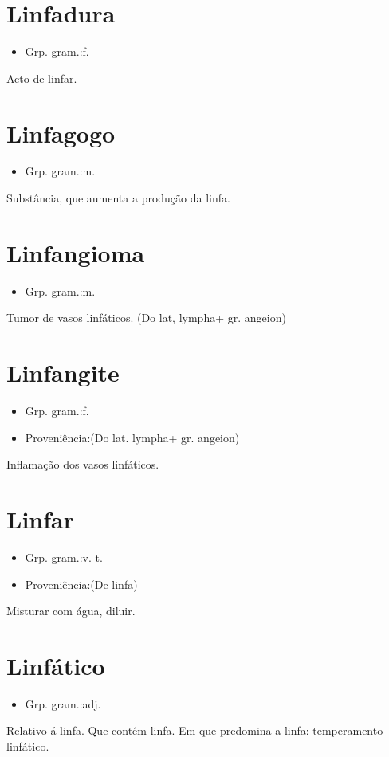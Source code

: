 \section{Linfadura}
\begin{itemize}
\item {Grp. gram.:f.}
\end{itemize}
Acto de linfar.
\section{Linfagogo}
\begin{itemize}
\item {Grp. gram.:m.}
\end{itemize}
Substância, que aumenta a produção da linfa.
\section{Linfangioma}
\begin{itemize}
\item {Grp. gram.:m.}
\end{itemize}
Tumor de vasos linfáticos.
(Do lat, \textunderscore lympha\textunderscore  + gr. \textunderscore angeion\textunderscore )
\section{Linfangite}
\begin{itemize}
\item {Grp. gram.:f.}
\end{itemize}
\begin{itemize}
\item {Proveniência:(Do lat. \textunderscore lympha\textunderscore  + gr. \textunderscore angeion\textunderscore )}
\end{itemize}
Inflamação dos vasos linfáticos.
\section{Linfar}
\begin{itemize}
\item {Grp. gram.:v. t.}
\end{itemize}
\begin{itemize}
\item {Proveniência:(De \textunderscore linfa\textunderscore )}
\end{itemize}
Misturar com água, diluir.
\section{Linfático}
\begin{itemize}
\item {Grp. gram.:adj.}
\end{itemize}
Relativo á linfa.
Que contém linfa.
Em que predomina a linfa: \textunderscore temperamento linfático\textunderscore .
